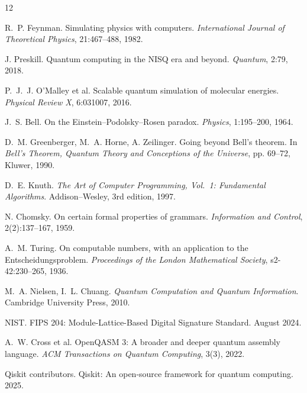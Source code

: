 \documentclass[11pt,a4paper]{report}
\begin{document}
\begin{thebibliography}{12}

R.~P. Feynman. Simulating physics with computers.
\emph{International Journal of Theoretical Physics}, 21:467--488, 1982.

J. Preskill. Quantum computing in the NISQ era and beyond.
\emph{Quantum}, 2:79, 2018.

P.~J.~J. O'Malley et al. Scalable quantum simulation of molecular
energies. \emph{Physical Review X}, 6:031007, 2016.

J.~S. Bell. On the Einstein--Podolsky--Rosen paradox.
\emph{Physics}, 1:195--200, 1964.

D.~M. Greenberger, M.~A. Horne, A. Zeilinger. Going beyond Bell's
theorem. In \emph{Bell's Theorem, Quantum Theory and Conceptions of the
Universe}, pp. 69--72, Kluwer, 1990.

D.~E. Knuth. \emph{The Art of Computer Programming, Vol.~1: Fundamental
Algorithms}. Addison--Wesley, 3rd edition, 1997.

N. Chomsky. On certain formal properties of grammars.
\emph{Information and Control}, 2(2):137--167, 1959.

A.~M. Turing. On computable numbers, with an application to the
Entscheidungsproblem. \emph{Proceedings of the London Mathematical
Society}, s2-42:230--265, 1936.

M.~A. Nielsen, I.~L. Chuang. \emph{Quantum Computation and Quantum
Information}. Cambridge University Press, 2010.

NIST. FIPS 204: Module-Lattice-Based Digital Signature Standard.
August 2024.

A.~W. Cross et al. OpenQASM 3: A broader and deeper quantum assembly
language. \emph{ACM Transactions on Quantum Computing}, 3(3), 2022.

Qiskit contributors. Qiskit: An open-source framework for quantum
computing. 2025.

\end{thebibliography}
\end{document}
